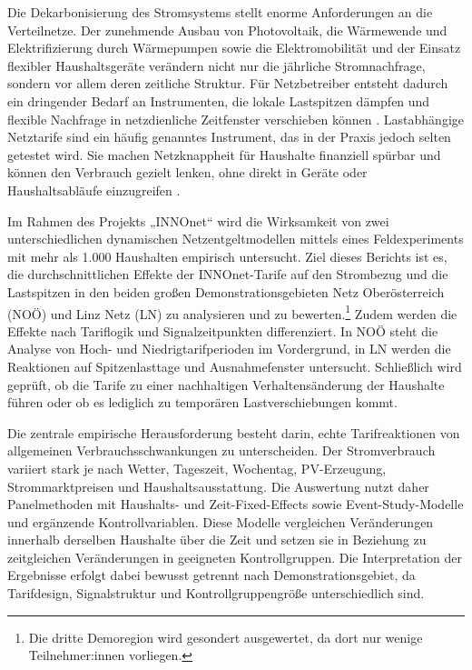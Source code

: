 Die Dekarbonisierung des Stromsystems stellt enorme Anforderungen an die Verteilnetze. Der zunehmende Ausbau von Photovoltaik, die Wärmewende und Elektrifizierung durch Wärmepumpen sowie die Elektromobilität und der Einsatz flexibler Haushaltsgeräte verändern nicht nur die jährliche Stromnachfrage, sondern vor allem deren zeitliche Struktur. Für Netzbetreiber entsteht dadurch ein dringender Bedarf an Instrumenten, die lokale Lastspitzen dämpfen und flexible Nachfrage in netzdienliche Zeitfenster verschieben können \citep{acerAnnualReport2022}. Lastabhängige Netztarife sind ein häufig genanntes Instrument, das in der Praxis jedoch selten getestet wird. Sie machen Netzknappheit für Haushalte finanziell spürbar und können den Verbrauch gezielt lenken, ohne direkt in Geräte oder Haushaltsabläufe einzugreifen \citep{boiteux1960}.

Im Rahmen des Projekts „INNOnet“ wird die Wirksamkeit von zwei unterschiedlichen dynamischen Netzentgeltmodellen mittels eines Feldexperiments mit mehr als 1.000 Haushalten empirisch untersucht.
Ziel dieses Berichts ist es, die durchschnittlichen Effekte der INNOnet-Tarife auf den Strombezug und die Lastspitzen in den beiden großen Demonstrationsgebieten Netz Oberösterreich (NOÖ) und Linz Netz (LN) zu analysieren und zu bewerten.\footnote{Die dritte Demoregion wird gesondert ausgewertet, da dort nur wenige Teilnehmer:innen vorliegen.} Zudem werden die Effekte nach Tariflogik und Signalzeitpunkten differenziert. In NOÖ steht die Analyse von Hoch- und Niedrigtarifperioden im Vordergrund, in LN werden die Reaktionen auf Spitzenlasttage und Ausnahmefenster untersucht. Schließlich wird geprüft, ob die Tarife zu einer nachhaltigen Verhaltensänderung der Haushalte führen oder ob es lediglich zu temporären Lastverschiebungen kommt.

Die zentrale empirische Herausforderung besteht darin, echte Tarifreaktionen von allgemeinen Verbrauchsschwankungen zu unterscheiden. Der Stromverbrauch variiert stark je nach Wetter, Tageszeit, Wochentag, PV-Erzeugung, Strommarktpreisen und Haushaltsausstattung. Die Auswertung nutzt daher Panelmethoden mit Haushalts- und Zeit-Fixed-Effects sowie Event-Study-Modelle und ergänzende Kontrollvariablen. Diese Modelle vergleichen Veränderungen innerhalb derselben Haushalte über die Zeit und setzen sie in Beziehung zu zeitgleichen Veränderungen in geeigneten Kontrollgruppen. Die Interpretation der Ergebnisse erfolgt dabei bewusst getrennt nach Demonstrationsgebiet, da Tarifdesign, Signalstruktur und Kontrollgruppengröße unterschiedlich sind.


